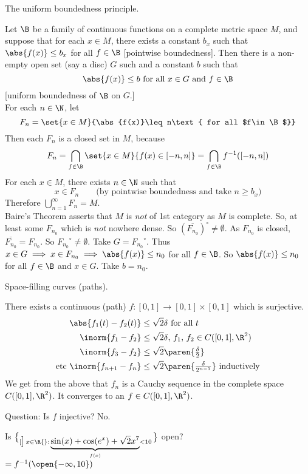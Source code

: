 The uniform boundedness principle.

Let $\B$ be a family of continuous functions on a complete metric space $M$, and suppose that for each $x\in M$, there exists a constant $b_x$ such that $\abs{f(x)}\leq b_x$ for all $f\in\B$ [pointwise boundedness].  Then there is a non-empty open set (say a disc) $G$ such and a constant $b$ such that
\[ \abs{f(x)}\leq b \text{ for all $x\in G$ and $f\in\B$} \]
[uniform boundedness of $\B$ on $G$.] \\
\pf For each $n\in\N$, let
\[ F_n = \set{x\in M}{\abs{f(x)}\leq n\text{ for all $f\in\B$}} \]
Then each $F_n$ is a closed set in $M$, because
\[ F_n = \bigcap_{f\in\B} \set{x\in M}{f(x)\in[-n,n]} = \bigcap_{f\in\B} f^{-1}([-n,n]) \]
For each $x\in M$, there exists $n\in\N$ such that
\[ x\in F_n \qquad\text{(by pointwise boundedness and take $n\geq b_x$)} \]
Therefore $\bigcup_{n=1}^\infty F_n = M$. \\
Baire's Theorem asserts that $M$ is \emph{not} of 1st category as $M$ is complete.  So, at least some $F_{n_0}$ which is \emph{not} nowhere dense.  So $(\overline{F_{n_0}})^\circ\neq\emptyset$.  As $F_{n_0}$ is closed, $\overline{F_{n_0}}=F_{n_0}$.  So ${F_{n_0}}^\circ\neq\emptyset$.  Take $G={F_{n_0}}^\circ$.  Thus $x\in G\implies x\in F_{n_0}\implies\abs{f(x)}\leq n_0$ for all $f\in\B$.  So $\abs{f(x)}\leq n_0$ for all $f\in\B$ and $x\in G$.  Take $b=n_0$.

Space-filling curves (paths).

\prop There exists a continuous (path) $f\colon[0,1]\to[0,1]\times[0,1]$ which is surjective.
\begin{align*}
\abs{f_1(t)-f_2(t)} &\leq \sqrt2 \delta \text{ for all $t$} \\
\inorm{f_1-f_2} &\leq \sqrt2 \delta \text{, $f_1$, $f_2\in C([0,1],\R^2)$} \\
\inorm{f_3-f_2} &\leq \sqrt2 \paren{\tfrac{\delta}{2}} \\
\text{etc } \inorm{f_{n+1}-f_n} &\leq \sqrt2 \paren{\tfrac{\delta}{2^{n-1}}} \text{ inductively}
\end{align*}
We get from the above that $f_n$ is a Cauchy sequence in the complete space $C([0,1],\R^2)$.  It converges to an $f\in C([0,1],\R^2)$.

Question: Is $f$ injective?  No.

Is $\brace[\big]{\,x\in\R{}:{}\underbrace{\sin(x)+\cos(e^x)+\sqrt2x^7}_{f(x)}<10\,}$ open? \\
$=f^{-1}(\open{-\infty,10})$
